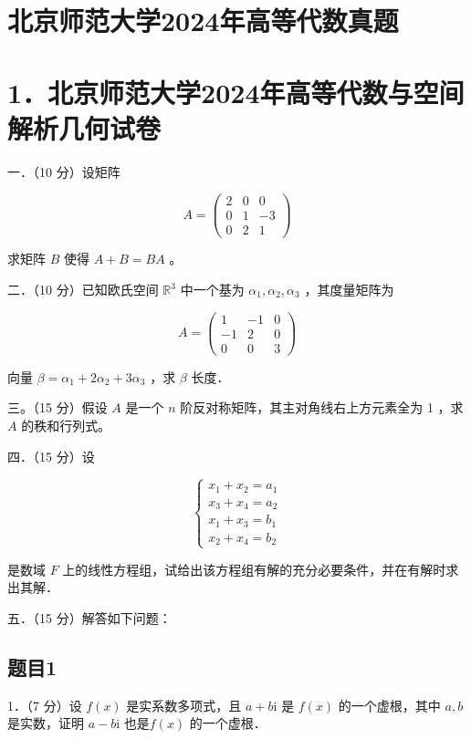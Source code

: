 \documentclass{article}
\begin{document}
\section*{北京师范大学2024年高等代数真题}
\section*{1．北京师范大学2024年高等代数与空间解析几何试卷}
一．（10 分）设矩阵

\[
A=\left(\begin{array}{ccc}
2 & 0 & 0 \\
0 & 1 & -3 \\
0 & 2 & 1
\end{array}\right)
\]

求矩阵 \(B\) 使得 \(A+B=B A\) 。

二．（10 分）已知欧氏空间 \(\mathbb{R}^{3}\) 中一个基为 \(\alpha_{1}, \alpha_{2}, \alpha_{3}\) ，其度量矩阵为

\[
A=\left(\begin{array}{ccc}
1 & -1 & 0 \\
-1 & 2 & 0 \\
0 & 0 & 3
\end{array}\right)
\]

向量 \(\beta=\alpha_{1}+2 \alpha_{2}+3 \alpha_{3}\) ，求 \(\beta\) 长度．

三。（15 分）假设 \(A\) 是一个 \(n\) 阶反对称矩阵，其主对角线右上方元素全为 1 ，求 \(A\) 的秩和行列式。

四．（15 分）设

\[
\left\{\begin{array}{l}
x_{1}+x_{2}=a_{1} \\
x_{3}+x_{4}=a_{2} \\
x_{1}+x_{3}=b_{1} \\
x_{2}+x_{4}=b_{2}
\end{array}\right.
\]

是数域 \(F\) 上的线性方程组，试给出该方程组有解的充分必要条件，并在有解时求出其解．

五．（15 分）解答如下问题：\\

\subsection{题目1}
1．（7 分）设 \(f(x)\) 是实系数多项式，且 \(a+b \mathrm{i}\) 是 \(f(x)\) 的一个虚根，其中 \(a, b\) 是实数，证明 \(a-b \mathrm{i}\) 也是\(f(x)\) 的一个虚根．\\
\end{document}
